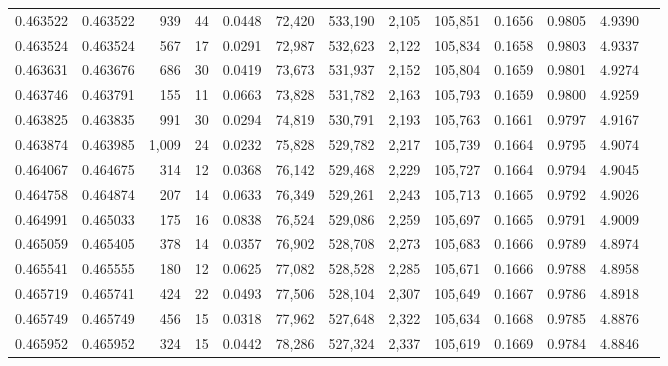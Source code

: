 \begin{tabular}{rrrrrrrrrrrrr}
0.463522 & 0.463522 &   939 &    44 &                                     0.0448 &  72,420 & 533,190 &   2,105 & 105,851 & 0.1656 & 0.9805 & 4.9390 \\
0.463524 & 0.463524 &   567 &    17 &                                     0.0291 &  72,987 & 532,623 &   2,122 & 105,834 & 0.1658 & 0.9803 & 4.9337 \\
0.463631 & 0.463676 &   686 &    30 &                                     0.0419 &  73,673 & 531,937 &   2,152 & 105,804 & 0.1659 & 0.9801 & 4.9274 \\
0.463746 & 0.463791 &   155 &    11 &                                     0.0663 &  73,828 & 531,782 &   2,163 & 105,793 & 0.1659 & 0.9800 & 4.9259 \\
0.463825 & 0.463835 &   991 &    30 &                                     0.0294 &  74,819 & 530,791 &   2,193 & 105,763 & 0.1661 & 0.9797 & 4.9167 \\
0.463874 & 0.463985 & 1,009 &    24 &                                     0.0232 &  75,828 & 529,782 &   2,217 & 105,739 & 0.1664 & 0.9795 & 4.9074 \\
0.464067 & 0.464675 &   314 &    12 &                                     0.0368 &  76,142 & 529,468 &   2,229 & 105,727 & 0.1664 & 0.9794 & 4.9045 \\
0.464758 & 0.464874 &   207 &    14 &                                     0.0633 &  76,349 & 529,261 &   2,243 & 105,713 & 0.1665 & 0.9792 & 4.9026 \\
0.464991 & 0.465033 &   175 &    16 &                                     0.0838 &  76,524 & 529,086 &   2,259 & 105,697 & 0.1665 & 0.9791 & 4.9009 \\
0.465059 & 0.465405 &   378 &    14 &                                     0.0357 &  76,902 & 528,708 &   2,273 & 105,683 & 0.1666 & 0.9789 & 4.8974 \\
0.465541 & 0.465555 &   180 &    12 &                                     0.0625 &  77,082 & 528,528 &   2,285 & 105,671 & 0.1666 & 0.9788 & 4.8958 \\
0.465719 & 0.465741 &   424 &    22 &                                     0.0493 &  77,506 & 528,104 &   2,307 & 105,649 & 0.1667 & 0.9786 & 4.8918 \\
0.465749 & 0.465749 &   456 &    15 &                                     0.0318 &  77,962 & 527,648 &   2,322 & 105,634 & 0.1668 & 0.9785 & 4.8876 \\
0.465952 & 0.465952 &   324 &    15 &                                     0.0442 &  78,286 & 527,324 &   2,337 & 105,619 & 0.1669 & 0.9784 & 4.8846 \\

\end{tabular}
